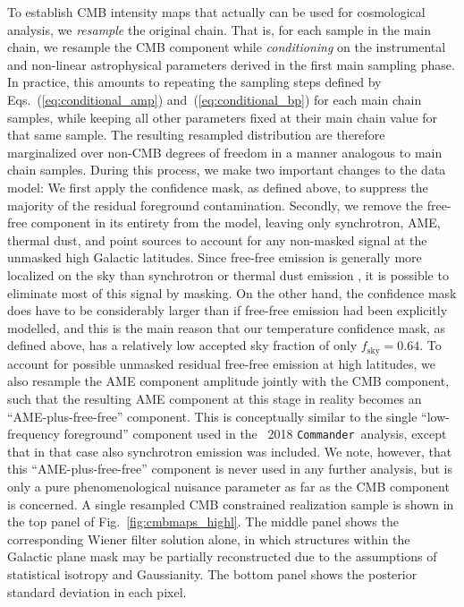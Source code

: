 \documentclass[twocolumn]{aa}
\def\commander{\texttt{Commander}}
\newcommand{\red}[0]{\color{red}}
\begin{document}
To establish CMB intensity maps that actually can be used for
cosmological analysis, we \emph{resample} the original chain. That is,
for each sample in the main chain, we resample the CMB component while
\emph{conditioning} on the instrumental and non-linear astrophysical
parameters derived in the first main sampling phase. {\red In practice, this amounts to repeating the sampling steps defined by Eqs.~(\ref{eq:conditional_amp}) and~(\ref{eq:conditional_bp}) for each main chain samples, while keeping all other parameters fixed at their main chain value for that same sample. The resulting resampled distribution are therefore marginalized over non-CMB degrees of freedom in a manner analogous to main chain samples.}  During this
process, we make two important changes to the data model: We first
apply the confidence mask, as defined above, to suppress the majority
of the residual foreground contamination. Secondly, we remove the
free-free component in its entirety from the model, leaving only
synchrotron, AME, thermal dust, and point sources to account for any
non-masked signal at the unmasked high Galactic latitudes. Since
free-free emission is generally more localized on the sky than
synchrotron or thermal dust emission \citep{planck2014-a10,bp13}, it
is possible to eliminate most of this signal by masking. On the other
hand, the confidence mask does have to be considerably larger than if
free-free emission had been explicitly modelled, and this is the main
reason that our temperature confidence mask, as defined above, has a
relatively low accepted sky fraction of only
$f_{\mathrm{sky}}=0.64$. To account for possible unmasked residual
free-free emission at high latitudes, we also resample the AME
component amplitude jointly with the CMB component, such that the
resulting AME component at this stage in reality becomes an
``AME-plus-free-free'' component. This is conceptually similar to the
single ``low-frequency foreground'' component used in the
\Planck\ 2018 \commander\ analysis, except that in that case also
synchrotron emission was included. We note, however, that this
``AME-plus-free-free'' component is never used in any further
analysis, but is only a pure phenomenological nuisance parameter as
far as the CMB component is concerned. A single resampled CMB
constrained realization sample is shown in the top panel of
Fig.~\ref{fig:cmbmaps_highl}. The middle panel shows the corresponding
Wiener filter solution alone, in which structures within the Galactic
plane mask may be partially reconstructed due to the assumptions
of statistical isotropy and Gaussianity. The bottom panel shows the
posterior standard deviation in each pixel.
\end{document}
